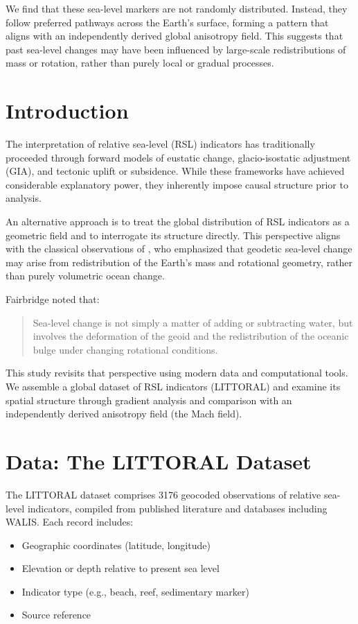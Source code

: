 \documentclass[twocolumn]{article}
\begin{document}
We find that these sea-level markers are not randomly distributed. Instead, they follow preferred pathways across the Earth’s surface, forming a pattern that aligns with an independently derived global anisotropy field. This suggests that past sea-level changes may have been influenced by large-scale redistributions of mass or rotation, rather than purely local or gradual processes.

\section{Introduction}

The interpretation of relative sea-level (RSL) indicators has traditionally proceeded through forward models of eustatic change, glacio-isostatic adjustment (GIA), and tectonic uplift or subsidence. While these frameworks have achieved considerable explanatory power, they inherently impose causal structure prior to analysis.

An alternative approach is to treat the global distribution of RSL indicators as a geometric field and to interrogate its structure directly. This perspective aligns with the classical observations of \citet{fairbridge1961}, who emphasized that geodetic sea-level change may arise from redistribution of the Earth's mass and rotational geometry, rather than purely volumetric ocean change.

Fairbridge noted that:
\begin{quote}
Sea-level change is not simply a matter of adding or subtracting water, but involves the deformation of the geoid and the redistribution of the oceanic bulge under changing rotational conditions.
\end{quote}

This study revisits that perspective using modern data and computational tools. We assemble a global dataset of RSL indicators (LITTORAL) and examine its spatial structure through gradient analysis and comparison with an independently derived anisotropy field (the Mach field).

\section{Data: The LITTORAL Dataset}

The LITTORAL dataset comprises 3176 geocoded observations of relative sea-level indicators, compiled from published literature and databases including WALIS. Each record includes:

\begin{itemize}
\item Geographic coordinates (latitude, longitude)
\item Elevation or depth relative to present sea level
\item Indicator type (e.g., beach, reef, sedimentary marker)
\item Source reference
\end{itemize}
\end{document}
